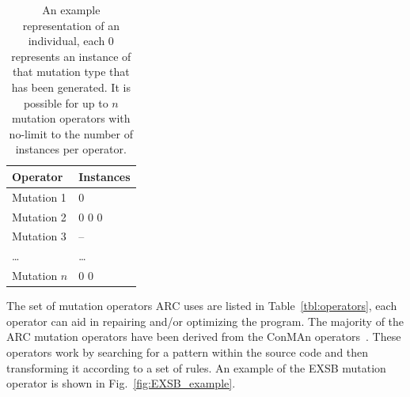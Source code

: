 \documentclass{llncs}
\begin{document}
\begin{table}[h]
\begin{center}
\caption{An example representation of an individual, each 0 represents an
instance of that mutation type that has been generated. It is possible for up
to $n$ mutation operators with no-limit to the number of instances per
operator.}
\begin{tabular}{|l|l|}
\hline
\textbf{Operator} & \textbf{Instances}\\
\hline
Mutation 1 & 0\\
\hline
Mutation 2 & 0 0 0\\
\hline
Mutation 3 & --\\
\hline
\ldots & \ldots\\
\hline
Mutation $n$ & 0 0\\
\hline
\end{tabular}
\label{tbl:individual_representation}
\end{center}
\end{table}

The set of mutation operators ARC uses are listed in Table~\ref{tbl:operators},
each operator can aid in repairing and/or optimizing the program. The majority
of the ARC mutation operators have been derived from the ConMAn
operators~\cite{BCD06}. These operators work by searching for a pattern within
the source code and then transforming it according to a set of rules. An
example of the EXSB mutation operator is shown in Fig.~\ref{fig:EXSB_example}.
\end{document}
